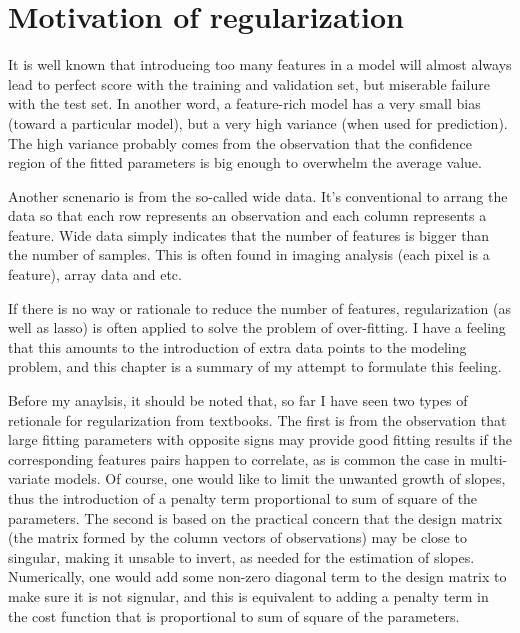 \section{Motivation of regularization}
It is well known that introducing too many features in a model will almost always lead to perfect score with the training and validation set, 
but miserable failure with the test set. In another word, a feature-rich model has a very small bias (toward a particular model), but a very 
high variance (when used for prediction). The high variance probably comes from the observation that the confidence region of the fitted 
parameters is big enough to overwhelm the average value.

Another scnenario is from the so-called wide data. It's conventional to arrang the data so that each row represents
an observation and each column represents a feature. Wide data simply indicates that the number of features is bigger
than the number of samples. This is often found in imaging analysis (each pixel is a feature), array data and etc.


If there is no way or rationale to reduce the number of features, regularization (as well as lasso) is often applied to solve the problem of over-fitting. 
I have a feeling that this amounts to the introduction of extra data points to the modeling problem, and this chapter is a summary of my 
attempt to formulate this feeling.

Before my anaylsis, it should be noted that, so far I have seen two types of retionale for regularization from textbooks. The first is from the observation that large fitting parameters with opposite signs may provide good fitting results if the corresponding features pairs happen to correlate, as is common the case in multi-variate models. Of course, one would like to limit the unwanted growth of slopes, thus the introduction of a penalty term proportional to sum of square of the parameters. The second is based on the practical concern that the design matrix (the matrix formed by the column vectors of observations) may be close to singular, making it unsable to invert, as needed for the estimation of slopes. Numerically, one would add some non-zero diagonal term to the design matrix to make sure it is not signular, and this is equivalent to adding a penalty term in the cost function that is proportional to sum of square of the parameters. 

